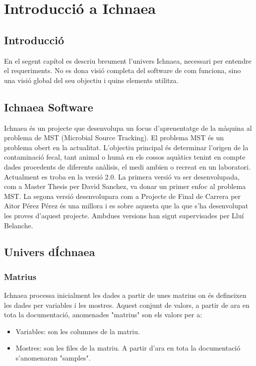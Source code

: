 \chapter{Introducci\'{o} a Ichnaea}
\label{cha:background}

\section*{Introducci\'{o}}
En el segent cap\'{i}tol es descriu breument l'univers Ichnaea, necessari per entendre el requeriments. No es dona visi\'{o} completa del software de com funciona, sino una visi\'{o} global del seu objectiu i quins elements utilitza.

\section{Ichnaea Software}
Ichnaea \'{e}s un projecte que desenvolupa un focus d'aprenentatge de la m\`{a}quina al problema de MST (Microbial Source Tracking). El problema MST \'{e}s un problema obert en la actualitat. L'objectiu principal \'{e}s determinar l'origen de la contaminaci\'{o} fecal, tant animal o hum\`{a} en els cossos aqu\`{a}tics tenint en compte dades procedents de diferents an\`{a}lisis, el medi ambien o recreat en un laboratori. \\

Actualment es troba en la versi\'{o} 2.0. La primera versi\'{o} va ser desenvolupada, com a Master Thesis per David Sanchez, va donar un primer enfoc al problema MST. La segona versi\'{o} desenvolupara com a Projecte de Final de Carrera per Aitor P\'{e}rez P\'{e}rez \'{e}s una millora i es sobre aquesta que la que s'ha desenvolupat les proves d'aquest projecte. Ambdues versions han sigut supervisades per Llu\'{i} Belanche.\\

\section{Univers d\'Ichnaea}

\subsection{Matrius}
Ichnaea processa inicialment les dades a partir de unes matrius on \'e{s} defineixen les dades per variables i les mostres. Aquest conjunt de valors, a partir de ara en tota la documentaci\'{o}, anomenades "matrius" son els valors per a:
\begin{itemize}
\item Variables: son les columnes de la matriu. 
\item Mostres: son les files de la matriu. A partir d'ara en tota la documentaci\'{o} s'anomenaran "samples".
\end{itemize}

